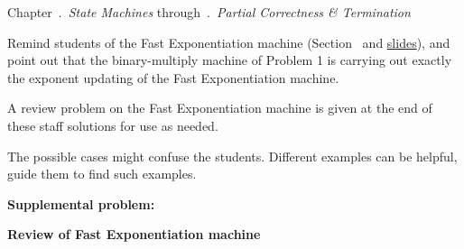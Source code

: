 \documentclass[handout]{mcs}
\begin{document}

\begin{staffnotes}
Chapter~.\ \emph{State Machines}
through~.\ \emph{Partial Correctness \&
  Termination}
\end{staffnotes}


\begin{staffnotes}
Remind students of the Fast Exponentiation machine
(Section~ and
\href{https://courses.csail.mit.edu/6.042/spring16/slidepdfs/state-machines.pdf}{slides}),
and point out that the binary-multiply machine of Problem 1 is
carrying out exactly the exponent updating of the Fast Exponentiation
machine.

A review problem on the Fast Exponentiation machine is given at the
end of these staff solutions for use as needed.
\end{staffnotes}



\begin{staffnotes}
The possible cases might confuse the students. Different examples can be helpful, guide them to find such examples.
\end{staffnotes}


\textbf{Supplemental problem:}


\begin{staffnotes}

\begin{center}
\textbf{Review of Fast Exponentiation machine}
\end{center}


\end{staffnotes}

\end{document}
